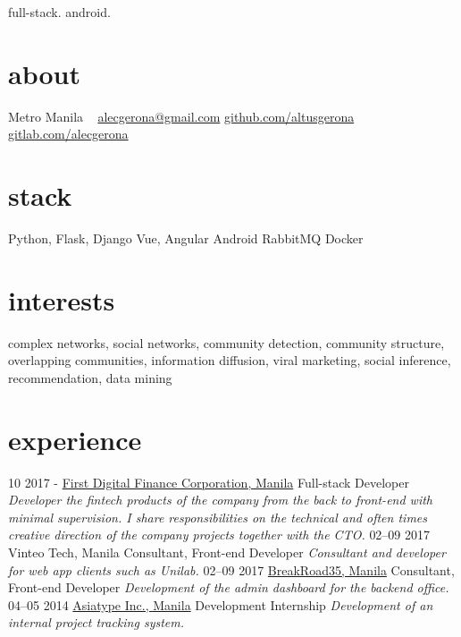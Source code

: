 \documentclass[]{friggeri-cv}
\begin{document}
       {full-stack. android.}


\begin{aside}
  \section{about}
    Metro Manila
    ~
    \href{mailto:adrien@friggeri.net}{alecgerona@gmail.com}
    \href{github.com/altusgerona}{github.com/altusgerona}
    \href{https://gitlab.com/alecgerona}{gitlab.com/alecgerona}
  \section{stack}
    Python, Flask, Django
    Vue, Angular
    Android
    RabbitMQ
    Docker
\end{aside}

\section{interests}

complex networks, social networks, community detection, community structure,
overlapping communities, information diffusion, viral marketing, social
inference, recommendation, data mining

\section{experience}

\begin{entrylist}
  \entry
    {10 2017 -}
    {\href{firstdigitalfinance.com}{First Digital Finance Corporation, Manila}}
    {Full-stack Developer}
    {\emph{Developer the fintech products of the company from the back to front-end with minimal supervision. I share responsibilities on the technical and often times creative direction of the company projects together with the CTO.
}}
  \entry
    {02–09 2017}
    {Vinteo Tech, Manila}
    {Consultant, Front-end Developer}
    {\emph{Consultant and developer for web app clients such as Unilab.}}
  \entry
    {02–09 2017}
    {\href{http://breakroad.com/}{BreakRoad35, Manila}}
    {Consultant, Front-end Developer}
    {\emph{Development of the admin dashboard for the backend office.}}
  \entry
    {04–05 2014}
    {\href{http://www.asiatype.com/}{Asiatype Inc., Manila}}
    {Development Internship}
    {\emph{Development of an internal project tracking system.}}
\end{entrylist}
\end{document}
